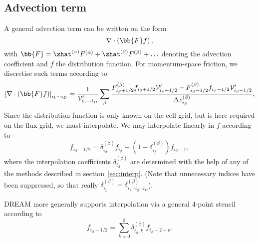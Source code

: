 \documentclass{notes}
\newcommand{\Vp}{\mathcal{V}'}
\begin{document}
    \subsection{Advection term}\label{sec:advection}
    A general advection term can be written on the form
    \begin{equation*}
        \nabla\cdot\left( \bb{F} f \right),
    \end{equation*}
    with $\bb{F} = \zhat^{(\alpha)}F^{(\alpha)} + \zhat^{(\beta)}F^{(\beta)}+\ldots$
    denoting the advection coefficient and $f$ the distribution function. For
    momentum-space friction, we discretise such terms according to
    \begin{equation}\label{eq:advection:discr}
        \left[\nabla\cdot\left( \bb{F}f \right) \right]_{i_1\cdots i_D} =
            \frac{1}{\Vp_{i_1\cdots i_D}}\sum_\beta \frac{
                F^{(\beta)}_{i_\beta+1/2}f_{i_\beta+1/2} \Vp_{i_\beta+1/2} -
                F^{(\beta)}_{i_\beta-1/2}f_{i_\beta-1/2} \Vp_{i_\beta-1/2}
            }{\Delta z^{(\beta)}_{i_\beta}},
    \end{equation}
    Since the distribution function is only known on the cell grid, but is here
    required on the flux grid, we must interpolate. We may interpolate linearly in
    $f$ according to
    \begin{equation}
        f_{i_\beta-1/2} = \delta^{(\beta)}_{i_\beta} f_{i_\beta} + \left( 1 - \delta^{(\beta)}_{i_\beta} \right) f_{i_\beta-1},
    \end{equation}
    where the interpolation coefficients $\delta^{(\beta)}_{i_\beta}$ are
    determined with the help of any of the methods described in
    section~\ref{sec:interp}. (Note that unnecessary indices have been
    suppressed, so that really
    $\delta^{(\beta)}_{i_\beta} = \delta^{(\beta)}_{i_1\cdots i_\beta\cdots i_D}$).
    
    DREAM more generally supports interpolation via a general 4-point stencil according to
    \begin{equation}
        f_{i_\beta-1/2} = \sum_{k=0}^3 \delta^{(\beta)}_{i_\beta,k} f_{i_\beta-2+k}.
    \end{equation}
    
\end{document}
